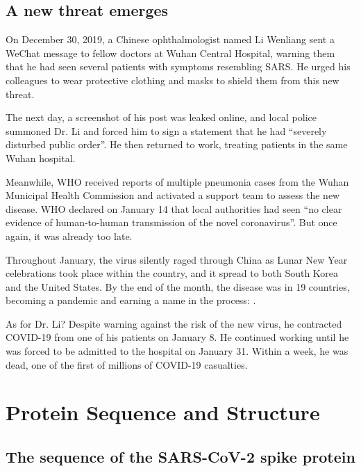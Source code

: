 \FloatBarrier
{}
\subsection{A new threat emerges}

On December 30, 2019, a Chinese ophthalmologist named Li Wenliang sent a WeChat message to fellow doctors at Wuhan Central Hospital, warning them that he had seen several patients with symptoms resembling SARS. He urged his colleagues to wear protective clothing and masks to shield them from this new threat.

The next day, a screenshot of his post was leaked online, and local police summoned Dr. Li and forced him to sign a statement that he had ``severely disturbed public order''. He then returned to work, treating patients in the same Wuhan hospital.

Meanwhile, WHO received reports of multiple pneumonia cases from the Wuhan Municipal Health Commission and activated a support team to assess the new disease. WHO declared on January 14 that local authorities had seen ``no clear evidence of human-to-human transmission of the novel coronavirus''. But once again, it was already too late.

Throughout January, the virus silently raged through China as Lunar New Year celebrations took place within the country, and it spread to both South Korea and the United States. By the end of the month, the disease was in 19 countries, becoming a pandemic and earning a name in the process: .

As for Dr. Li? Despite warning against the risk of the new virus, he contracted COVID-19 from one of his patients on January 8. He continued working until he was forced to be admitted to the hospital on January 31. Within a week, he was dead, one of the first of millions of COVID-19 casualties.\\

\FloatBarrier
{}
\section{Protein Sequence and Structure}

\FloatBarrier
{}
\subsection{The sequence of the SARS-CoV-2 spike protein}

